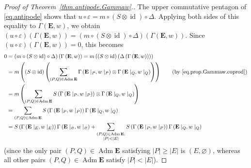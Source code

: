 \documentclass[12pt]{article}
\theoremstyle{plain}
\theoremstyle{definition}
\theoremstyle{remark}
\let\sumnonlimits\sum
\renewcommand{\sum}{\sumnonlimits\limits}
\newcommand{\id}{{\operatorname{id}}}
\newcommand{\Adm}{\operatorname{Adm}}
\newcommand{\EE}{{\mathbf{E}}}
\begin{document}
\begin{proof}[Proof of Theorem~\ref{thm.antipode.Gammaw}.]
The upper commutative pentagon of \eqref{eq.antipode} shows that
$u \circ \varepsilon = m \circ \left(S \otimes \id\right) \circ
\Delta$. Applying both sides of this equality to
$\Gamma\left(\EE, w\right)$, we obtain
\newline
$\left(u \circ \varepsilon\right)
\left(\Gamma\left(\EE, w\right)\right)
= \left(m \circ \left(S \otimes \id\right) \circ
\Delta\right) \left(\Gamma\left(\EE, w\right)\right)$.
Since
$\left(u \circ \varepsilon\right)
\left(\Gamma\left(\EE, w\right)\right) = 0$, this
becomes
\begin{align}
0
&= \left(m \circ \left(S \otimes \id\right) \circ
\Delta\right) \left(\Gamma\left(\EE, w\right)\right)
= m \left(\left(S \otimes \id\right) \left(
\Delta \left(\Gamma\left(\EE, w\right)\right)\right)\right)
\nonumber\\
&= m \left(\left(S \otimes \id\right) \left(
\sum_{\left(P, Q\right) \in \Adm \EE}
\Gamma\left(\EE\mid_P, w\mid_P\right)
\otimes \Gamma\left(\EE\mid_Q, w\mid_Q\right) \right) \right)
\qquad \left(\text{by \eqref{eq.prop.Gammaw.coprod}}\right)
\nonumber\\
&= m \left(\sum_{\left(P, Q\right) \in \Adm \EE}
S\left(\Gamma\left(\EE\mid_P, w\mid_P\right)\right)
\otimes
\Gamma\left(\EE\mid_Q, w\mid_Q\right)\right)
\nonumber\\
&= \sum_{\left(P, Q\right) \in \Adm \EE}
S\left(\Gamma\left(\EE\mid_P, w\mid_P\right)\right)
\Gamma\left(\EE\mid_Q, w\mid_Q\right)
\nonumber \\
&= S \left(\Gamma\left(\EE\mid_E, w\mid_E\right)\right)
\Gamma\left(\EE\mid_\varnothing, w\mid_\varnothing\right)
+ \sum_{\substack{\left(P, Q\right) \in \Adm \EE ; \\
                  \left|P\right| < \left|E\right|}}
S\left(\Gamma\left(\EE\mid_P, w\mid_P\right)\right)
\Gamma\left(\EE\mid_Q, w\mid_Q\right)
\label{pf.thm.antipode.Gammaw.Req.1}
\end{align}
(since the only pair $\left(P, Q\right) \in \Adm \EE$ satisfying
$\left|P\right| \geq \left|E\right|$ is $\left(E, \varnothing\right)$,
whereas all other pairs $\left(P, Q\right) \in \Adm \EE$
satisfy $\left|P\right| < \left|E\right|$).


\end{proof}
\end{document}
